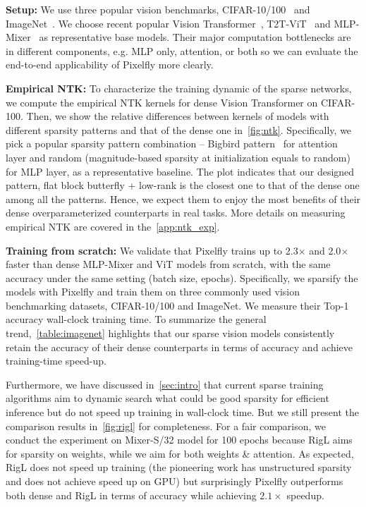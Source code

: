 \textbf{Setup:} We use three popular vision benchmarks, CIFAR-10/100~\citep{krizhevsky2009learning} and ImageNet~\citep{deng2009imagenet}. We choose recent popular Vision Transformer~\citep{dosovitskiy2020image}, T2T-ViT~\citep{yuan2021tokens} and MLP-Mixer~\citep{tolstikhin2021mlp} as representative base models. Their major computation bottlenecks are in different components, e.g. MLP only, attention, or both so we can evaluate the end-to-end applicability of Pixelfly more clearly.

\textbf{Empirical NTK:} To characterize the training dynamic of the sparse networks, we compute the empirical NTK kernels for dense Vision Transformer on CIFAR-100. Then, we show the relative differences between kernels of models with different sparsity patterns and that of the dense one in~\ref{fig:ntk}. Specifically, we pick a popular sparsity pattern combination -- Bigbird pattern~\citep{zaheer2020bigbird} for attention layer and random (magnitude-based sparsity at initialization equals to random) for MLP layer, as a representative baseline. The plot indicates that our designed pattern, flat block butterfly + low-rank is the closest one to that of the dense one among all the patterns. Hence, we expect them to enjoy the most benefits of their dense overparameterized counterparts in real tasks. More details on measuring empirical NTK are covered in the~\ref{app:ntk_exp}.

\textbf{Training from scratch:} We validate that Pixelfly trains up to 2.3$\times$ and 2.0$\times$ faster than dense MLP-Mixer and ViT models from scratch, with the same accuracy under the same setting (batch size, epochs). Specifically, we sparsify the models with Pixelfly and train them on three commonly used vision benchmarking datasets, CIFAR-10/100 and ImageNet. We measure their Top-1 accuracy wall-clock training time. To summarize the general trend,~\ref{table:imagenet} highlights that our sparse vision models consistently retain the accuracy of their dense counterparts in terms of accuracy and achieve training-time speed-up.

Furthermore, we have discussed in~\ref{sec:intro} that current sparse training algorithms aim to dynamic search what could be good sparsity for efficient inference but do not speed up training in wall-clock time. But we still present the comparison results in~\ref{fig:rigl} for completeness. For a fair comparison, we conduct the experiment on Mixer-S/32 model for 100 epochs because RigL aims for sparsity on weights, while we aim for both weights \& attention. As expected, RigL does not speed up training (the pioneering work has unstructured sparsity and does not achieve speed up on GPU) but surprisingly Pixelfly outperforms both dense and RigL in terms of accuracy while achieving $2.1\times$ speedup.

